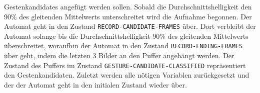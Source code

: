 Gestenkandidates angefügt werden sollen. Sobald die Durchschnittshelligkeit den 90\% des gleitenden Mittelwerts unterschreitet wird die Aufnahme begonnen. Der Automat geht in den Zustand \texttt{RECORD-CANDIDATE-FRAMES}
über. Dort verbleibt der Automat solange bis die Durchschnittshelligkeit 90\% des gleitenden Mittelwerts überschreitet, woraufhin der Automat in den Zustand \texttt{RECORD-ENDING-FRAMES} über geht, indem die letzten 3
Bilder an den Puffer angehängt werden. Der Zustand des Puffers im Zustand \texttt{GESTURE-CANDIDATE-CLASSIFIED} repräsentiert den Gestenkandidaten. Zuletzt werden alle nötigen Variablen zurückgesetzt und der
der Automat geht in den initialen Zustand wieder über.